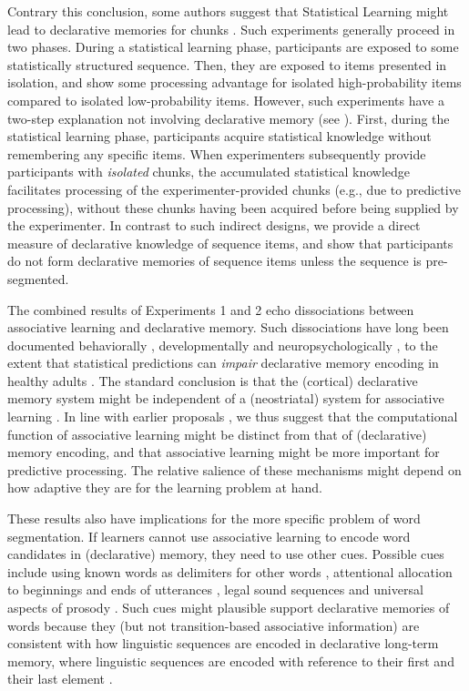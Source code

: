 \documentclass[]{article}
\begin{document}
Contrary this conclusion, some authors suggest that Statistical Learning might lead to declarative memories for chunks \citep{Estes2007, Isbilen2020}. Such experiments generally proceed in two phases. During a statistical learning phase, participants are exposed to some statistically structured sequence. Then, they are exposed to items presented in isolation, and show some processing advantage for isolated high-probability items compared to isolated low-probability items. However, such experiments have a two-step explanation not involving declarative memory (see \citealp{Endress-Phantoms-Vision}). First, during the statistical learning phase, participants acquire statistical knowledge without remembering any specific items. When experimenters subsequently provide participants with {\em isolated} chunks, the accumulated statistical knowledge facilitates processing of the experimenter-provided chunks (e.g., due to predictive processing), without these chunks having been acquired before being supplied by the experimenter. In contrast to such indirect designs, we provide a direct measure of declarative knowledge of sequence items, and show that participants do not form declarative memories of sequence items unless the sequence is pre-segmented.

The combined results of Experiments 1 and 2 echo dissociations between associative learning and declarative memory. Such dissociations have long been documented behaviorally \citep{Graf1984}, developmentally \citep{Finn2016} and neuropsychologically \citep{Knowlton1996a, Poldrack2001, Squire1992}, to the extent that statistical predictions can \emph{impair} declarative memory encoding in healthy adults \citep{Sherman2020}. The standard conclusion is that the (cortical) declarative memory system might be independent of a (neostriatal) system for associative learning \citep{Knowlton1996a, Poldrack2001, Squire1992}. In line with earlier proposals \citep{Turk-Browne2010, Sherman2020}, we thus suggest that the computational function of associative learning might be distinct from that of (declarative) memory encoding, and that associative learning might be more important for predictive processing. The relative salience of these mechanisms might depend on how adaptive they are for the learning problem at hand.

These results also have implications for the more specific problem of word segmentation. If learners cannot use associative learning to encode word candidates in (declarative) memory, they need to use other cues. Possible cues include using known words as delimiters for other words \citep{Bortfeld2005, Brent2001, Mersad2012}, attentional allocation to beginnings and ends of utterances \citep{Monaghan2010, Seidl2008, Shukla2007}, legal sound sequences \citep{McQueen1998} and universal aspects of prosody \citep{Brentari2011, Christophe2001, Endress-cross-seg, Pilon1981}. Such cues might plausible support declarative memories of words because they (but not transition-based associative information) are consistent with how linguistic sequences are encoded in declarative long-term memory, where linguistic sequences are encoded with reference to their first and their last element \citep{Endress-Phantoms-Vision, Fischer-Baum2011}. 
\end{document}
